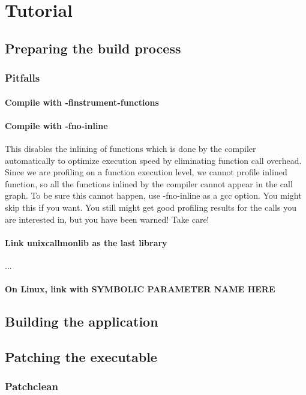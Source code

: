 \section{Tutorial}

\subsection{Preparing the build process} 
\subsubsection{Pitfalls}

\paragraph{Compile with -finstrument-functions} 
\paragraph{Compile with -fno-inline} This disables the inlining of functions which is done by the compiler automatically to optimize execution speed by eliminating function call overhead. Since we are profiling on a function execution level, we cannot profile inlined function, so all the functions inlined by the compiler cannot appear in the call graph. To be sure this cannot happen, use -fno-inline as a gcc option. You might skip this if you want. You still might get good profiling results for the calls you are interested in, but you have been warned! Take care!

\paragraph{Link unixcallmonlib as the last library} ...

\paragraph{On Linux, link with SYMBOLIC PARAMETER NAME HERE}

\subsection{Building the application}

\subsection{Patching the executable} 
\subsubsection{Patchclean} 
